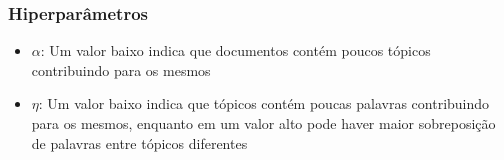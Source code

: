 \subsubsection{Hiperparâmetros}

\begin{itemize}
    \item $\alpha$: Um valor baixo indica que documentos contém poucos tópicos contribuindo para os mesmos
    \item $\eta$: Um valor baixo indica que tópicos contém poucas palavras contribuindo para os mesmos, enquanto em um valor alto pode haver maior sobreposição 
    de palavras entre tópicos diferentes
\end{itemize}